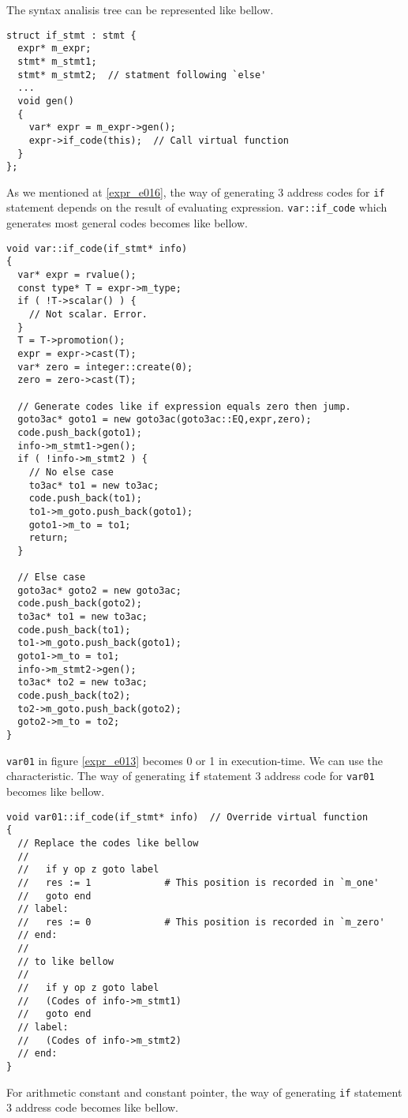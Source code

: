 The syntax analisis tree can be represented like bellow.
\begin{verbatim}
struct if_stmt : stmt {
  expr* m_expr;
  stmt* m_stmt1;
  stmt* m_stmt2;  // statment following `else'
  ...
  void gen()
  {
    var* expr = m_expr->gen();
    expr->if_code(this);  // Call virtual function
  }
};
\end{verbatim}
As we mentioned at \ref{expr_e016}, the way of generating 3 address
codes for {\tt{if}} statement depends on the result of evaluating 
expression. {\tt{var::if\_code}} which generates most general codes
becomes like bellow.
\begin{verbatim}
void var::if_code(if_stmt* info)
{
  var* expr = rvalue();
  const type* T = expr->m_type;
  if ( !T->scalar() ) {
    // Not scalar. Error.
  }
  T = T->promotion();
  expr = expr->cast(T);
  var* zero = integer::create(0);
  zero = zero->cast(T);

  // Generate codes like if expression equals zero then jump.
  goto3ac* goto1 = new goto3ac(goto3ac::EQ,expr,zero);
  code.push_back(goto1);
  info->m_stmt1->gen();
  if ( !info->m_stmt2 ) {
    // No else case
    to3ac* to1 = new to3ac;
    code.push_back(to1);
    to1->m_goto.push_back(goto1);
    goto1->m_to = to1;
    return;
  }

  // Else case
  goto3ac* goto2 = new goto3ac;
  code.push_back(goto2);
  to3ac* to1 = new to3ac;
  code.push_back(to1);
  to1->m_goto.push_back(goto1);
  goto1->m_to = to1;
  info->m_stmt2->gen();
  to3ac* to2 = new to3ac;
  code.push_back(to2);
  to2->m_goto.push_back(goto2);
  goto2->m_to = to2;
}
\end{verbatim}
{\tt{var01}} in figure \ref{expr_e013} becomes 0 or 1 in
execution-time. We can use the characteristic.
The way of generating {\tt{if}} statement 3 address code for {\tt{var01}} 
becomes like bellow.
\begin{verbatim}
void var01::if_code(if_stmt* info)  // Override virtual function
{
  // Replace the codes like bellow
  //
  //   if y op z goto label
  //   res := 1             # This position is recorded in `m_one'
  //   goto end
  // label:
  //   res := 0             # This position is recorded in `m_zero'
  // end:
  //
  // to like bellow
  //
  //   if y op z goto label
  //   (Codes of info->m_stmt1)
  //   goto end
  // label:
  //   (Codes of info->m_stmt2)
  // end:
}
\end{verbatim}
For arithmetic constant and constant pointer,
the way of generating {\tt{if}} statement 3 address code
becomes like bellow.
